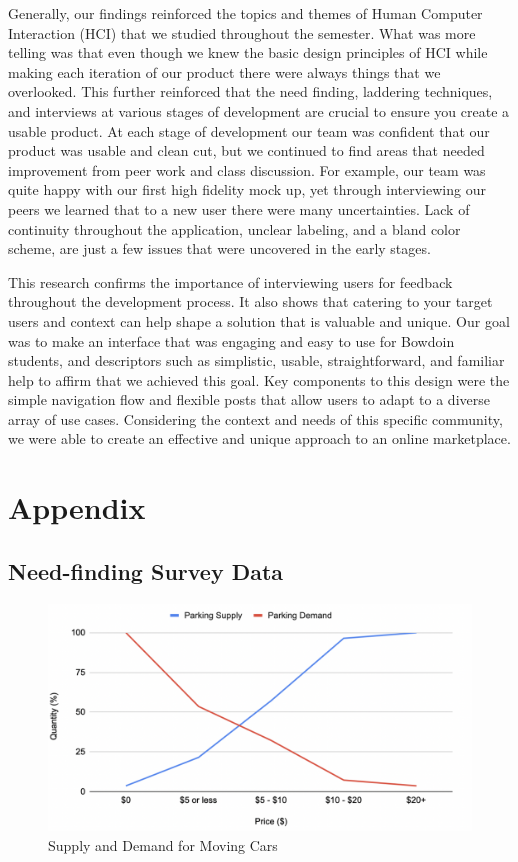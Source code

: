 Generally, our findings reinforced the topics and themes of Human Computer Interaction (HCI) that we studied throughout the semester. What was more telling was that even though we knew the basic design principles of HCI while making each iteration of our product there were always things that we overlooked. This further reinforced that the need finding, laddering techniques, and interviews at various stages of development are crucial to ensure you create a usable product. At each stage of development our team was confident that our product was usable and clean cut, but we continued to find areas that needed improvement from peer work and class discussion. For example, our team was quite happy with our first high fidelity mock up, yet through interviewing our peers we learned that to a new user there were many uncertainties. Lack of continuity throughout the application, unclear labeling, and a bland color scheme, are just a few issues that were uncovered in the early stages.

This research confirms the importance of interviewing users for feedback throughout the development process. It also shows that catering to your target users and context can help shape a solution that is valuable and unique. Our goal was to make an interface that was engaging and easy to use for Bowdoin students, and descriptors such as simplistic, usable, straightforward, and familiar help to affirm that we achieved this goal. Key components to this design were the simple navigation flow and flexible posts that allow users to adapt to a diverse array of use cases. Considering the context and needs of this specific community, we were able to create an effective and unique approach to an online marketplace.
    
     

\section{Appendix}

\subsection{Need-finding Survey Data}

\begin{figure}[ht]
        \centering
        \caption{Supply and Demand for Moving Cars}
        \includegraphics[width=1\textwidth]{images/cars.png}
        
        \label{fig:bird1}
    \end{figure}

